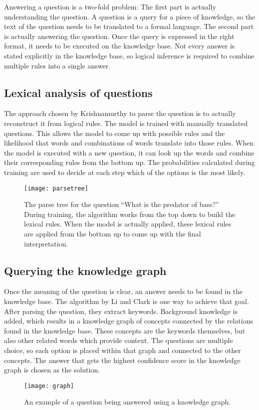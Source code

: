 Answering a question is a two-fold problem: The first part is actually understanding the question. A question is a query for a piece of knowledge, so the text of the question needs to be translated to a formal language. The second part is actually answering the question. Once the query is expressed in the right format, it needs to be executed on the knowledge base. Not every answer is stated explicitly in the knowledge base, so logical inference is required to combine multiple rules into a single answer. 
\subsection{Lexical analysis of questions}
The approach chosen by Krishnamurthy \cite{probseman} to parse the question is to actually reconstruct it from logical rules. The model is trained with manually translated questions. This allows the model to come up with possible rules and the likelihood that words and combinations of words translate into those rules. When the model is executed with a new question, it can look up the words and combine their corresponding rules from the bottom up. The probabilities calculated during training are used to decide at each step which of the options is the most likely.
\begin{figure}
\texttt{[image: parsetree]}
\caption{The parse tree for the question ``What is the predator of bass?'' During training, the algorithm works from the top down to build the lexical rules. When the model is actually applied, these lexical rules are applied from the bottom up to come up with the final interpretation.}\label{fig:parsetree}
\end{figure}

\subsection{Querying the knowledge graph}
Once the meaning of the question is clear, an answer needs to be found in the knowledge base. The algorithm by Li and Clark \cite{sciencequestions} is one way to achieve that goal. After parsing the question, they extract keywords. Background knowledge is added, which results in a knowledge graph of concepts connected by the relations found in the knowledge base. These concepts are the keywords themselves, but also other related words which provide context. The questions are multiple choice, so each option is placed within that graph and connected to the other concepts. The answer that gets the highest confidence score in the knowledge graph is chosen as the solution.

\begin{figure}
\texttt{[image: graph]}
\caption{An example of a question being answered using a knowledge graph.}\label{fig:parsetree}
\end{figure}